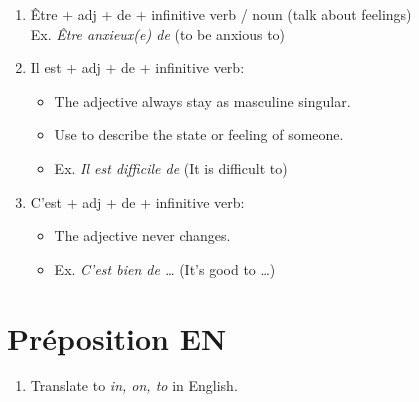 \documentclass{book}
\begin{document}
\begin{enumerate}
                \item Être + adj + de + infinitive verb / noun (talk about feelings) \\
                        Ex. \textit{Être anxieux(e) de} (to be anxious to)
                \item Il est + adj + de + infinitive verb:
                    \begin{itemize}
                        \item The adjective always stay as masculine singular.
                        \item Use to describe the state or feeling of someone.
                        \item Ex. \textit{Il est difficile de} (It is difficult to)
                    \end{itemize}
                \item C'est + adj + de + infinitive verb:
                    \begin{itemize}
                        \item The adjective never changes.
                        \item Ex. \textit{C'est bien de \dots} (It's good to \dots)
                    \end{itemize}  
            \end{enumerate}

    \section{Préposition EN}
        \begin{enumerate}
            \item Translate to \textit{in, on, to} in English.
        \end{enumerate}
\end{document}
